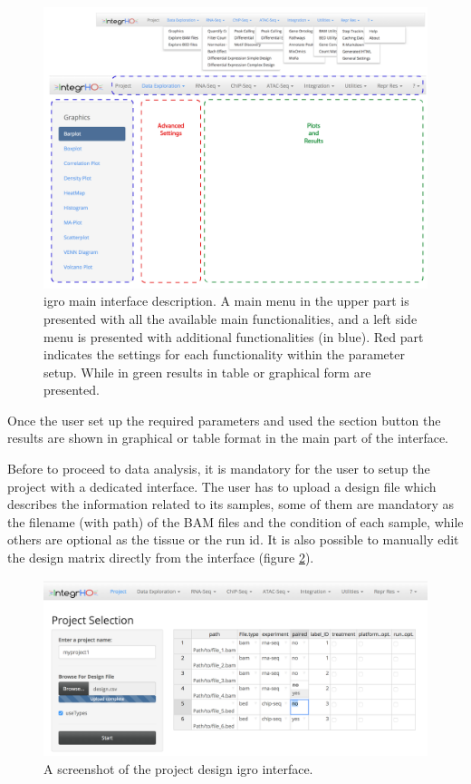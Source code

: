 \begin{figure}[H]
\centering
\includegraphics[width=\textwidth, keepaspectratio]{img/integrho/interface.png}
\caption[\gls{igro} main interface]{\gls{igro} main interface description. A main menu in the upper part is presented with all the available main functionalities, and a left side menu is presented with additional functionalities (in blue). Red part indicates the settings for each functionality within the parameter setup. While in green results in table or graphical form are presented.}
\label{fig:integrhomain}
\end{figure}

Once the user set up the required parameters and used the section button the results are shown in graphical or table format in the main part of the interface.

Before to proceed to data analysis, it is mandatory for the user to setup the project with a dedicated interface. 
The user has to upload a design file which describes the information related to its samples, some of them are mandatory as the filename (with path) of the BAM files and the condition of each sample, while others are optional as the tissue or the run id. 
It is also possible to manually edit the design matrix directly from the interface (figure \ref{fig:integrhodesign}).

\begin{figure}[H]
\centering
\includegraphics[width=\textwidth, keepaspectratio]{img/integrho/design.png}
\caption[integrho design interface]{A screenshot of the project design \gls{igro} interface.}
\label{fig:integrhodesign}
\end{figure}

